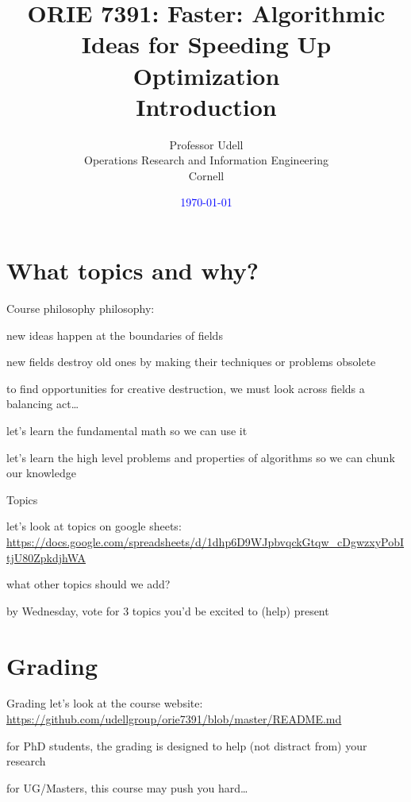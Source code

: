 \documentclass[presentation,xcolor={usenames,dvipsnames}]{beamer}
\title{ORIE 7391: Faster: Algorithmic Ideas for Speeding Up Optimization\\[2ex]
       Introduction}
\date{\textcolor{blue}{\today}}
\author{Professor Udell \\[1ex]
Operations Research and Information Engineering \\
Cornell}
\begin{document}
\begin{frame}
\titlepage
\end{frame}

\section{What topics and why?}

\begin{frame}{Course philosophy}
philosophy:
\bit
\item new ideas happen at the boundaries of fields
\item new fields destroy old ones by making their techniques or problems obsolete
\item to find opportunities for creative destruction, we must look across fields
\eit
\vfill \pause
a balancing act\ldots
\bit
\item let's learn the fundamental math so we can use it
\item let's learn the high level problems and properties of algorithms so we can chunk our knowledge
\eit

\end{frame}

\begin{frame}{Topics}

let's look at topics on google sheets: \\
\url{https://docs.google.com/spreadsheets/d/1dhp6D9WJpbvqckGtqw_cDgwzxyPobItjU80ZpkdjhWA}

\bit
\item what other topics should we add?
\item by Wednesday, vote for 3 topics you'd be excited to (help) present
\eit

\end{frame}

\section{Grading}

\begin{frame}{Grading}
let's look at the course website: \\
\url{https://github.com/udellgroup/orie7391/blob/master/README.md}
\vfill
\bit
\item for PhD students, the grading is designed to help (not distract from) your research
\item for UG/Masters, this course may push you hard\ldots
\eit
\end{frame}
\end{document}
